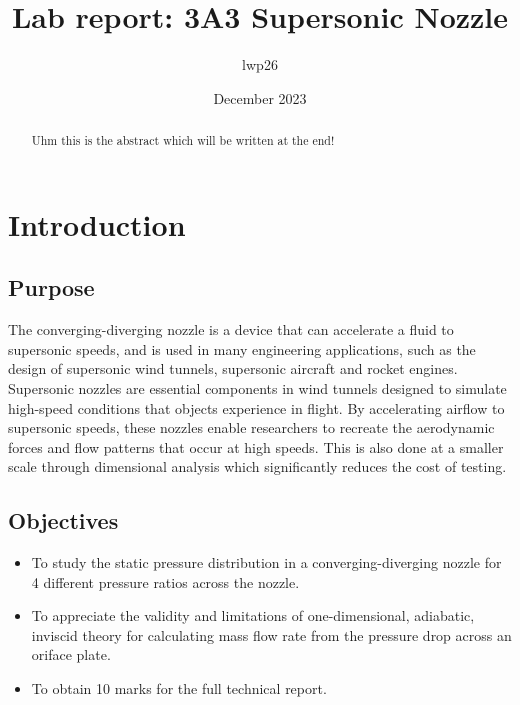 \documentclass{article}
\begin{document}

\title{Lab report: 3A3 Supersonic Nozzle}
\author{lwp26}
\date{December 2023}
\maketitle

\begin{abstract}
    \centering
    Uhm this is the abstract which will be written at the end!
\end{abstract}

\section{Introduction}

\subsection{Purpose}
The converging-diverging nozzle is a device that can accelerate a fluid to supersonic speeds, and is used in many engineering applications, such as the design of supersonic wind tunnels, supersonic aircraft and rocket engines.
Supersonic nozzles are essential components in wind tunnels designed to simulate high-speed conditions that objects experience in flight.
By accelerating airflow to supersonic speeds, these nozzles enable researchers to recreate the aerodynamic forces and flow patterns that occur at high speeds.
This is also done at a smaller scale through dimensional analysis which significantly reduces the cost of testing.


\subsection{Objectives}

\begin{itemize}
    \item To study the static pressure distribution in a converging-diverging nozzle for 4 different pressure ratios across the nozzle.
    \item To appreciate the validity and limitations of one-dimensional, adiabatic, inviscid theory for calculating mass flow rate from the pressure drop across an oriface plate.
    \item To obtain 10 marks for the full technical report.
\end{itemize}
\end{document}
